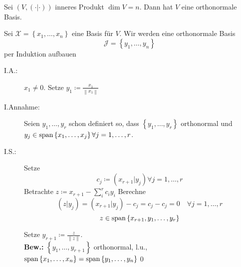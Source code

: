 \begin{subtheorem}
	Sei $ (V, ( \cdot | \cdot )) $ inneres Produkt $ \dim V = n $.
	Dann hat $ V $ eine orthonormale Basis.
\end{subtheorem}
\begin{subproof*}
	Sei $ \mathcal{X}  = \left\{ x_1, \dotsc, x_n \right\} $ eine Basis für $ V $.
	Wir werden eine orthonormale Basis
	\[
		\mathcal{J} = \left\{ y_1, \dotsc, y_n \right\} 
	\]
	per Induktion aufbauen
	\begin{description}
		\item[I.A.:] $ x_1 \neq 0 $. Setze $ y_1 \coloneqq \frac{ x_1 }{ \left\| x_1 \right\|  }  $ 
		\item[I.Annahme:] Seien $ y_1, \dotsc, y_r $ schon definiert so, dass $ \left\{ y_1, \dotsc, y_r \right\}  $ orthonormal und $ y_j \in \operatorname{span} \left\{ x_1, \dotsc, x_j \right\} \forall j = 1, \dotsc, r $.
		\item[I.S.:]
			Setze
			\[
				c_j \coloneqq (x_{r + 1} | y_j) \forall j = 1, \dotsc, r
			\]
			Betrachte $ z \coloneqq x_{r + 1} - \sum_{i}^{r} c_i y_i $ 
			Berechne
			\[
				(z|y_j) = (x_{r + 1} | y_j) - c_j = c_j - c_j = 0 \quad \forall j = 1, \dotsc, r
			\]
			\[
				z \in \operatorname{span} \left\{ x_{r + 1}, y_1, \dotsc, y_r \right\} 
			\]
			
			Setze $ y_{r + 1} \coloneqq \frac{ z }{ \left\| z \right\|  }  $.\\
			\textbf{Bew.:} $ \left\{ y_1, \dotsc, y_{r + 1}  \right\}  $ orthonormal, l.u., $ \operatorname{span} \left\{ x_1, \dotsc, x_n \right\} = \operatorname{span} \left\{ y_1, \dotsc, y_n \right\}  $\qed
	\end{description}
\end{subproof*}

